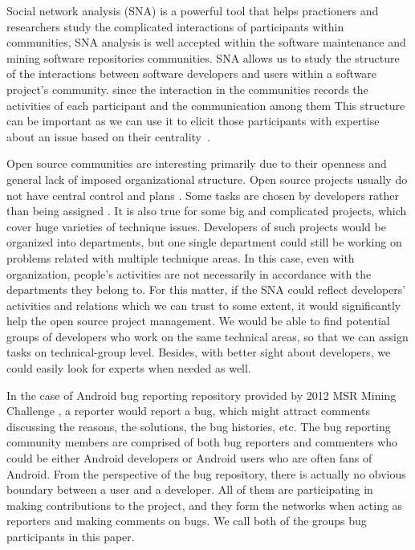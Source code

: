 \documentclass[10pt, conference, compsocconf]{IEEEtran}
\begin{document}
\label{introduction}

Social network analysis (SNA) is a powerful tool that helps
practioners and researchers study the complicated interactions of
participants within communities, SNA analysis is well accepted within
the software maintenance and mining software repositories communities.
SNA allows us to study the structure of the interactions between software developers and users
within a software project's community.
since the interaction in the communities records the activities of
each participant and the communication among them
This structure can be important as we can use it to elicit those
participants with expertise about an issue based on their centrality~\cite{ICSEsocio:meneely}. 

Open source communities are interesting primarily due to their
openness and general lack of imposed organizational structure\cite{ACM:chris}.
Open source projects usually do not have central control and plans
\cite{AMCIS:Freeh}. 
Some tasks are chosen by developers rather than being assigned
\cite{ACM:ashish}. 
It is also true for some big and complicated projects, which cover
huge varieties of technique issues. 
Developers of such projects would be organized into departments, but
one single department could still be working on problems related with
multiple technique areas. 
In this case, even with organization, people's activities are not
necessarily in accordance with the departments they belong to.
For this matter, if the SNA could reflect developers' activities and
relations which we can trust to some extent, it would significantly
help the open source project management. 
We would be able to find potential groups of developers who work on
the same technical areas, so that we can assign tasks on
technical-group level. 
Besides, with better sight about developers, we could easily look for
experts when needed as well.



In the case of Android bug reporting repository provided by 2012 MSR
Mining Challenge \cite{DATA:msr}, a reporter would report a bug, which
might attract comments discussing the reasons, the solutions, the bug
histories, etc. 
The bug reporting community members are comprised of both bug
reporters and commenters who could be either Android developers or
Android users who are often fans of Android. 
From the perspective of the bug repository, there is actually no
obvious boundary between a user and a developer. 
All of them are participating in making contributions to the project,
and they form the networks when acting as reporters and making
comments on bugs. 
We call both of the groups bug participants in this paper.
\end{document}
